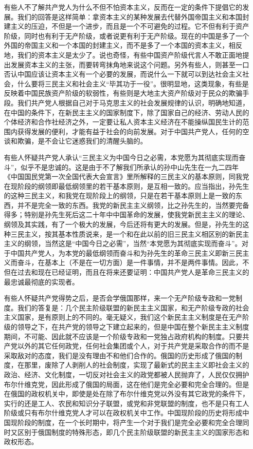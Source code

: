 有些人不了解共产党人为什么不但不怕资本主义，反而在一定的条件下提倡它的发展。我们的回答是这样简单：拿资本主义的某种发展去代替外国帝国主义和本国封建主义的压迫，不但是一个进步，而且是一个不可避免的过程。它不但有利于资产阶级，同时也有利于无产阶级，或者说更有利于无产阶级。现在的中国是多了一个外国的帝国主义和一个本国的封建主义，而不是多了一个本国的资本主义，相反地，我们的资本主义是太少了。说也奇怪，有些中国资产阶级代言人不敢正面地提出发展资本主义的主张，而要转弯抹角地来说这个问题。另外有些人，则甚至一口否认中国应该让资本主义有一个必要的发展，而说什么一下就可以到达社会主义社会，什么要将三民主义和社会主义“毕其功于一役”。很明显地，这类现象，有些是反映着中国民族资产阶级的软弱性，有些则是大地主大资产阶级对于民众的欺骗手段。我们共产党人根据自己对于马克思主义的社会发展规律的认识，明确地知道，在中国的条件下，在新民主主义的国家制度下，除了国家自己的经济、劳动人民的个体经济和合作社经济之外，一定要让私人资本主义经济在不能操纵国民生计的范围内获得发展的便利，才能有益于社会的向前发展。对于中国共产党人，任何的空谈和欺骗，是不会让它迷惑我们的清醒头脑的。

有些人怀疑共产党人承认“三民主义为中国今日之必需，本党愿为其彻底实现而奋斗”，似乎不是忠诚的。这是由于不了解我们所承认的孙中山先生在一九二四年《中国国民党第一次全国代表大会宣言》里所解释的三民主义的基本原则，同我党在现阶段的纲领即最低纲领里的若干基本原则，是互相一致的。应当指出，孙先生的这种三民主义，和我党在现阶段上的纲领，只是在若干基本原则上是一致的东西，并不是完全一致的东西。我党的新民主主义纲领，比之孙先生的，当然要完备得多；特别是孙先生死后这二十年中中国革命的发展，使我党新民主主义的理论、纲领及其实践，有了一个极大的发展，今后还将有更大的发展。但是，孙先生的这种三民主义，按其基本性质说来，是一个和在此以前的旧三民主义相区别的新民主主义的纲领，当然这是“中国今日之必需”，当然“本党愿为其彻底实现而奋斗”。对于中国共产党人，为本党的最低纲领而奋斗和为孙先生的革命三民主义即新三民主义而奋斗，在基本上（不是在一切方面）是一件事情，并不是两件事情。因此，不但在过去和现在已经证明，而且在将来还要证明：中国共产党人是革命三民主义的最忠诚最彻底的实现者。

有些人怀疑共产党得势之后，是否会学俄国那样，来一个无产阶级专政和一党制度。我们的答复是：几个民主阶级联盟的新民主主义国家，和无产阶级专政的社会主义国家，是有原则上的不同的。毫无疑义，我们这个新民主主义制度是在无产阶级的领导之下，在共产党的领导之下建立起来的，但是中国在整个新民主主义制度期间，不可能、因此就不应该是一个阶级专政和一党独占政府机构的制度。只要共产党以外的其它任何政党，任何社会集团或个人，对于共产党是采取合作的而不是采取敌对的态度，我们是没有理由不和他们合作的。俄国的历史形成了俄国的制度，在那里，废除了人剥削人的社会制度，实现了最新式的民主主义即社会主义的政治、经济、文化制度，一切反对社会主义的政党都被人民抛弃了，人民仅仅拥护布尔什维克党，因此形成了俄国的局面，这在他们是完全必要和完全合理的。但是在俄国的政权机关中，即使是处在除了布尔什维克党以外没有其它政党的条件下，实行的还是工人、农民和知识分子联盟，或党和非党联盟的制度，也不是只有工人阶级或只有布尔什维克党人才可以在政权机关中工作。中国现阶段的历史将形成中国现阶段的制度，在一个长时期中，将产生一个对于我们是完全必要和完全合理同时又区别于俄国制度的特殊形态，即几个民主阶级联盟的新民主主义的国家形态和政权形态。

